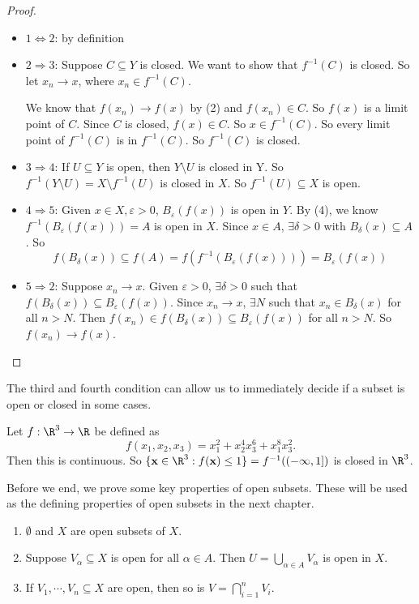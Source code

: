 \documentclass[a4paper]{article}
\begin{document}
\begin{proof}\leavevmode
  \begin{itemize}
    \item $1 \Leftrightarrow 2$: by definition
    \item $2 \Rightarrow 3$: Suppose $C\subseteq Y$ is closed. We want to show that $f^{-1}(C)$ is closed. So let $x_n \to x$, where $x_n \in f^{-1}(C)$.

      We know that $f(x_n) \to f(x)$ by (2) and $f(x_n) \in C$. So $f(x)$ is a limit point of $C$. Since $C$ is closed, $f(x) \in C$. So $x\in f^{-1}(C)$. So every limit point of $f^{-1}(C)$ is in $f^{-1}(C)$. So $f^{-1}(C)$ is closed.
    \item $3 \Rightarrow 4$: If $U\subseteq Y$ is open, then $Y\setminus U$ is closed in Y. So $f^{-1}(Y\setminus U) = X\setminus f^{-1}(U)$ is closed in $X$. So $f^{-1}(U)\subseteq X$ is open.

    \item $4 \Rightarrow 5$: Given $x\in X, \varepsilon > 0$, $B_\varepsilon(f(x))$ is open in $Y$. By (4), we know $f^{-1}(B_\varepsilon(f(x))) = A$ is open in $X$. Since $x\in A$, $\exists \delta > 0$ with $B_\delta (x) \subseteq A$. So
      \[
        f(B_\delta(x)) \subseteq f(A) = f(f^{-1}(B_\varepsilon (f(x)))) = B_\varepsilon (f(x))
      \]
    \item $5 \Rightarrow 2$: Suppose $x_n \to x$. Given $\varepsilon > 0$, $\exists \delta > 0$ such that $f(B_\delta(x)) \subseteq B_\varepsilon(f(x))$. Since $x_n \to x$, $\exists N$ such that $x_n \in B_\delta (x)$ for all $n > N$. Then $f(x_n) \in f(B_\delta(x))\subseteq B_\varepsilon(f(x))$ for all $n > N$. So $f(x_n) \to f(x)$.\qedhere
  \end{itemize}
\end{proof}

The third and fourth condition can allow us to immediately decide if a subset is open or closed in some cases.

\begin{eg}
  Let $f: \R^3 \to \R$ be defined as
  \[
    f(x_1, x_2, x_3) = x_1^2 + x_2^4 x_3^6 + x_1^8 x_3^2.
  \]
  Then this is continuous. So $\{\mathbf{x}\in \R^3: f(\mathbf{x}) \leq 1\} = f^{-1}((-\infty, 1])$ is closed in $\R^3$.
\end{eg}

Before we end, we prove some key properties of open subsets. These will be used as the defining properties of open subsets in the next chapter.
\begin{lemma}\leavevmode
  \begin{enumerate}
    \item $\emptyset$ and $X$ are open subsets of $X$.
    \item Suppose $V_\alpha \subseteq X$ is open for all $\alpha \in A$. Then $\displaystyle U = \bigcup_{\alpha \in A}V_\alpha$ is open in $X$.
    \item If $V_1, \cdots, V_n\subseteq X$ are open, then so is $\displaystyle V = \bigcap_{i = 1}^n V_i$.
  \end{enumerate}
\end{lemma}
\end{document}
